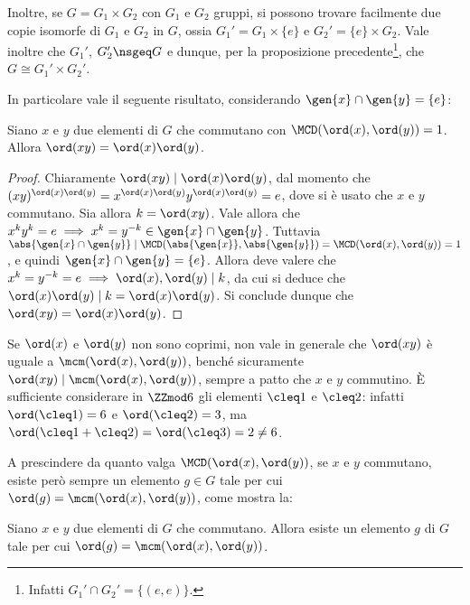 \documentclass[12pt]{scrartcl}
\begin{document}
	
	Inoltre, se $G = G_1 \times G_2$ con $G_1$ e $G_2$ gruppi, si possono trovare
	facilmente due copie isomorfe di $G_1$ e $G_2$ in $G$, ossia $G_1' = G_1 \times \{e\}$ e $G_2' = \{e\} \times G_2$.
	Vale inoltre che $G_1'$, $G_2' \nsgeq G$ e dunque,
	per la proposizione precedente\footnote{Infatti $G_1' \cap G_2' = \{(e,e)\}$.}, che
	$G \cong G_1' \times G_2'$. \medskip
	
	
	In particolare vale il seguente risultato, considerando
	$\gen{x} \cap \gen{y} = \{e\}$:
	
	\begin{proposition}
		Siano $x$ e $y$ due elementi di $G$ che commutano con
		$\MCD(\ord(x), \ord(y)) = 1$. Allora $\ord(xy) = \ord(x) \ord(y)$.
	\end{proposition}
	
	\begin{proof}
		Chiaramente $\ord(xy) \mid \ord(x) \ord(y)$, dal momento
		che $(xy)^{\ord(x) \ord(y)} = x^{\ord(x) \ord(y)} y^{\ord(x) \ord(y)} = e$, dove si è usato che $x$ e $y$ commutano.
		Sia allora $k = \ord(xy)$. Vale allora che
		$x^k y^k = e \implies x^k = y^{-k} \in \gen{x} \cap \gen{y}$.
		Tuttavia $\abs{\gen{x} \cap \gen{y}} \mid
		\MCD(\abs{\gen{x}}, \abs{\gen{y}}) = \MCD(\ord(x), \ord(y)) =
		1$, e quindi $\gen{x} \cap \gen{y} = \{e\}$. Allora
		deve valere che $x^k = y^{-k} = e \implies
		\ord(x), \ord(y) \mid k$, da cui si deduce che
		$\ord(x) \ord(y) \mid k = \ord(x) \ord(y)$. Si conclude dunque che
		$\ord(xy) = \ord(x) \ord(y)$.
	\end{proof}
	
	Se $\ord(x)$ e $\ord(y)$ non sono coprimi, non vale in generale
	che $\ord(xy)$ è uguale a $\mcm(\ord(x), \ord(y))$,
	benché sicuramente $\ord(xy) \mid \mcm(\ord(x), \ord(y))$,
	sempre a patto che $x$ e $y$ commutino.
	È sufficiente considerare in $\ZZmod6$ gli elementi
	$\cleq 1$ e $\cleq 2$: infatti $\ord(\cleq 1) = 6$ e
	$\ord(\cleq 2) = 3$, ma $\ord(\cleq 1 + \cleq 2) =
	\ord(\cleq 3) = 2 \neq 6$. \medskip
	
	
	A prescindere da quanto valga $\MCD(\ord(x), \ord(y))$,
	se $x$ e $y$ commutano, esiste però sempre un elemento
	$g \in G$ tale per cui $\ord(g) = \mcm(\ord(x), \ord(y))$, come
	mostra la:
	
	\begin{proposition}
		Siano $x$ e $y$ due elementi di $G$ che commutano. Allora
		esiste un elemento $g$ di $G$ tale per cui $\ord(g) = \mcm(\ord(x), \ord(y))$. 
	\end{proposition}
	
\end{document}
